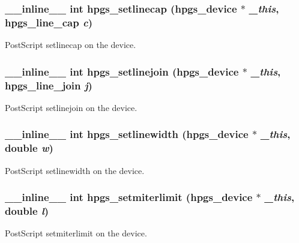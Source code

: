 \subsubsection[{hpgs\_\-setlinecap}]{\setlength{\rightskip}{0pt plus 5cm}\_\-\_\-inline\_\-\_\- int hpgs\_\-setlinecap ({\bf hpgs\_\-device} $\ast$ {\em \_\-this}, \/  {\bf hpgs\_\-line\_\-cap} {\em c})\hspace{0.3cm}{\ttfamily  [static]}}\label{group__device_gac6377b47ea8bb7cdf91edb3c87ff62f4}
PostScript setlinecap on the device. 
\subsubsection[{hpgs\_\-setlinejoin}]{\setlength{\rightskip}{0pt plus 5cm}\_\-\_\-inline\_\-\_\- int hpgs\_\-setlinejoin ({\bf hpgs\_\-device} $\ast$ {\em \_\-this}, \/  {\bf hpgs\_\-line\_\-join} {\em j})\hspace{0.3cm}{\ttfamily  [static]}}\label{group__device_ga03f06fc1905181c70923a4a50432e261}
PostScript setlinejoin on the device. 
\subsubsection[{hpgs\_\-setlinewidth}]{\setlength{\rightskip}{0pt plus 5cm}\_\-\_\-inline\_\-\_\- int hpgs\_\-setlinewidth ({\bf hpgs\_\-device} $\ast$ {\em \_\-this}, \/  double {\em w})\hspace{0.3cm}{\ttfamily  [static]}}\label{group__device_gadf3395c8e59649dc075d1b4f0d938124}
PostScript setlinewidth on the device. 
\subsubsection[{hpgs\_\-setmiterlimit}]{\setlength{\rightskip}{0pt plus 5cm}\_\-\_\-inline\_\-\_\- int hpgs\_\-setmiterlimit ({\bf hpgs\_\-device} $\ast$ {\em \_\-this}, \/  double {\em l})\hspace{0.3cm}{\ttfamily  [static]}}\label{group__device_ga653c3d98e3aa5167ff96f53729e73e1b}
PostScript setmiterlimit on the device. 
